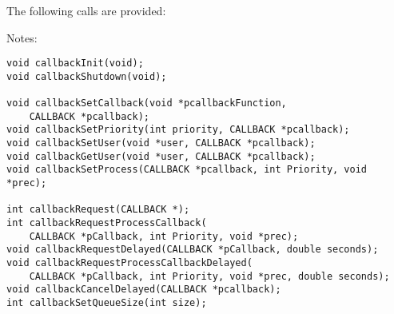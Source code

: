 The following calls are provided:

Notes:
\begin{verbatim}
void callbackInit(void);
void callbackShutdown(void);

void callbackSetCallback(void *pcallbackFunction,
    CALLBACK *pcallback);
void callbackSetPriority(int priority, CALLBACK *pcallback);
void callbackSetUser(void *user, CALLBACK *pcallback);
void callbackGetUser(void *user, CALLBACK *pcallback);
void callbackSetProcess(CALLBACK *pcallback, int Priority, void *prec);

int callbackRequest(CALLBACK *);
int callbackRequestProcessCallback(
    CALLBACK *pCallback, int Priority, void *prec);
void callbackRequestDelayed(CALLBACK *pCallback, double seconds);
void callbackRequestProcessCallbackDelayed(
    CALLBACK *pCallback, int Priority, void *prec, double seconds);
void callbackCancelDelayed(CALLBACK *pcallback);
int callbackSetQueueSize(int size);
\end{verbatim}

